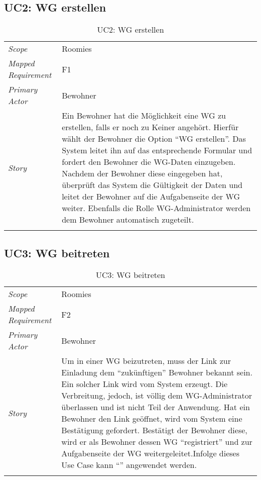 \subsection{UC2: WG erstellen}\label{subsec:uc2}
\begin{table}[H]
	\tablestyle
	\tablealtcolored
	\begin{tabularx}{\textwidth}{lX}
		\tablebody
			\textit{Scope} &
			Roomies
			\tabularnewline
			\textit{Mapped Requirement} &
			F1
			\tabularnewline
			\textit{Primary Actor} &
			Bewohner
			\tabularnewline
			\textit{Story} &
			Ein Bewohner hat die Möglichkeit eine WG zu erstellen, falls er noch zu Keiner angehört. Hierfür wählt der Bewohner die Option ``WG erstellen''. Das System leitet ihn auf das entsprechende Formular und fordert den Bewohner die WG-Daten einzugeben. Nachdem der Bewohner diese eingegeben hat, überprüft das System die Gültigkeit der Daten und leitet der Bewohner auf die Aufgabenseite der WG weiter. Ebenfalls die Rolle WG-Administrator werden dem Bewohner automatisch zugeteilt.
			\tabularnewline
		\tableend
	\end{tabularx}
	\caption{UC2: WG erstellen}
\end{table}


\subsection{UC3: WG beitreten}\label{subsec:uc3}
\begin{table}[H]
	\tablestyle
	\tablealtcolored
	\begin{tabularx}{\textwidth}{lX}
		\tablebody
			\textit{Scope} &
			Roomies
			\tabularnewline
			\textit{Mapped Requirement} &
			F2
			\tabularnewline
			\textit{Primary Actor} &
			Bewohner
			\tabularnewline
			\textit{Story} &
			Um in einer WG beizutreten, muss der Link zur Einladung dem ``zukünftigen'' Bewohner bekannt sein. Ein solcher Link wird vom System erzeugt. Die Verbreitung, jedoch, ist völlig dem WG-Administrator überlassen und ist nicht Teil der Anwendung. Hat ein Bewohner den Link geöffnet, wird vom System eine Bestätigung gefordert. Bestätigt der Bewohner diese, wird er als Bewohner dessen WG ``registriert'' und zur Aufgabenseite der WG weitergeleitet.\newline Infolge dieses Use Case kann ``\nameref{subsec:uc11}'' angewendet werden.
			\tabularnewline
		\tableend
	\end{tabularx}
	\caption{UC3: WG beitreten}
\end{table}


